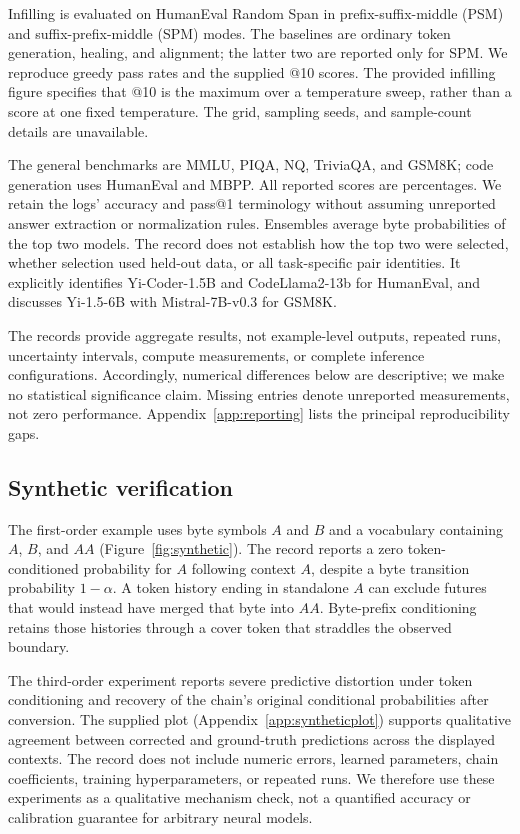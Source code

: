 \documentclass{article}
\begin{document}
Infilling is evaluated on HumanEval Random Span \citep{bavarian2022} in prefix-suffix-middle (PSM) and suffix-prefix-middle (SPM) modes. The baselines are ordinary token generation, healing, and alignment; the latter two are reported only for SPM. We reproduce greedy pass rates and the supplied @10 scores. The provided infilling figure specifies that @10 is the maximum over a temperature sweep, rather than a score at one fixed temperature. The grid, sampling seeds, and sample-count details are unavailable.

The general benchmarks are MMLU, PIQA, NQ, TriviaQA, and GSM8K; code generation uses HumanEval and MBPP. All reported scores are percentages. We retain the logs' accuracy and pass@1 terminology without assuming unreported answer extraction or normalization rules. Ensembles average byte probabilities of the top two models. The record does not establish how the top two were selected, whether selection used held-out data, or all task-specific pair identities. It explicitly identifies Yi-Coder-1.5B and CodeLlama2-13b for HumanEval, and discusses Yi-1.5-6B with Mistral-7B-v0.3 for GSM8K.

The records provide aggregate results, not example-level outputs, repeated runs, uncertainty intervals, compute measurements, or complete inference configurations. Accordingly, numerical differences below are descriptive; we make no statistical significance claim. Missing entries denote unreported measurements, not zero performance. Appendix~\ref{app:reporting} lists the principal reproducibility gaps.

\subsection{Synthetic verification}
\label{sec:synthetic}
The first-order example uses byte symbols $A$ and $B$ and a vocabulary containing $A$, $B$, and $AA$ (Figure~\ref{fig:synthetic}). The record reports a zero token-conditioned probability for $A$ following context $A$, despite a byte transition probability $1-\alpha$. A token history ending in standalone $A$ can exclude futures that would instead have merged that byte into $AA$. Byte-prefix conditioning retains those histories through a cover token that straddles the observed boundary.

The third-order experiment reports severe predictive distortion under token conditioning and recovery of the chain's original conditional probabilities after conversion. The supplied plot (Appendix~\ref{app:syntheticplot}) supports qualitative agreement between corrected and ground-truth predictions across the displayed contexts. The record does not include numeric errors, learned parameters, chain coefficients, training hyperparameters, or repeated runs. We therefore use these experiments as a qualitative mechanism check, not a quantified accuracy or calibration guarantee for arbitrary neural models.
\end{document}
